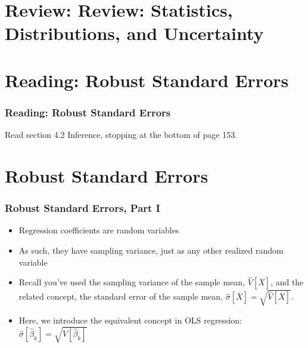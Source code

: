 \documentclass[12pt, block=fill]{beamer}
\newcommand{\paul}[1]{\textcolor{red}{#1}}
\begin{document}
\section{Review: Review: Statistics, Distributions, and Uncertainty}

\section{Reading: Robust Standard Errors}

\begin{frame}
  \frametitle{Reading: Robust Standard Errors}
  Read section 4.2 Inference, stopping at the bottom of page 153.
\end{frame}




\section{Robust Standard Errors} 

\begin{frame}
  \frametitle{Robust Standard Errors, Part I}

  \begin{itemize}
    \item Regression coefficients are random variables
    \item As such, they have sampling variance, just as any other realized random variable
    \item Recall you've used the sampling variance of the sample mean, $\hat{V}[\overline{X}]$, and the related concept, the standard error of the sample mean, $\hat{\sigma}[\overline{X}] = \sqrt{\hat{V}[\overline{X}]}$.
    \item Here, we introduce the equivalent concept in OLS regression:  $\hat{\sigma}[\hat{\beta}_{k}] = \sqrt{\hat{V}[\hat{\beta}_{k}]}$
  \end{itemize}
\end{frame}
\end{document}
